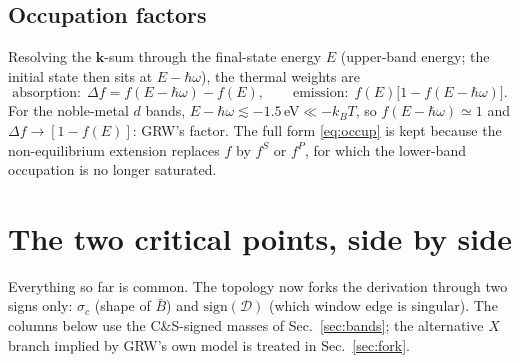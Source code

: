 \documentclass[11pt,a4paper]{article}
\numberwithin{equation}{section}
\newcommand{\hw}{\hbar\omega}
\newcommand{\cD}{\mathcal{D}}
\newcommand{\Bb}{\bar{B}}
\newcommand{\fFD}{f}
\newcommand{\kB}{k_B}
\begin{document}
\subsection{Occupation factors}\label{sec:occupation}

Resolving the $\mathbf k$-sum through the final-state energy $E$
(upper-band energy; the initial state then sits at $E-\hw$), the
thermal weights are
\begin{equation}
\text{absorption:}\ \ \Delta f=\fFD(E-\hw)-\fFD(E),
\qquad
\text{emission:}\ \ \fFD(E)\bigl[1-\fFD(E-\hw)\bigr].
\label{eq:occup}
\end{equation}
For the noble-metal $d$ bands, $E-\hw\lesssim-1.5\,$eV${}\ll-\kB T$,
so $\fFD(E-\hw)\simeq1$ and $\Delta f\to[1-\fFD(E)]$: GRW's factor.
The full form \eqref{eq:occup} is kept because the non-equilibrium
extension replaces $\fFD$ by $f^S$ or $f^P$, for which the lower-band
occupation is no longer saturated.

\section{The two critical points, side by side}\label{sec:XL}

Everything so far is common.  The topology now forks the derivation
through two signs only: $\sigma_c$ (shape of $\Bb$) and
$\mathrm{sign}(\cD)$ (which window edge is singular).  The columns
below use the C\&S-signed masses of Sec.~\ref{sec:bands}; the
alternative $X$ branch implied by GRW's own model is treated in
Sec.~\ref{sec:fork}.
\end{document}
